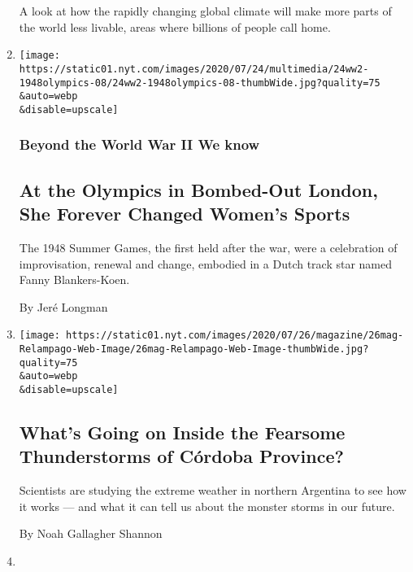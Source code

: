 \begin{enumerate}
  A look at how the rapidly changing global climate will make more parts
  of the world less livable, areas where billions of people call home.
\item
  \href{/2020/07/24/magazine/1948-olympics-fanny-blankers-koen.html}{}

  \texttt{[image: https://static01.nyt.com/images/2020/07/24/multimedia/24ww2-1948olympics-08/24ww2-1948olympics-08-thumbWide.jpg?quality=75\\\&auto=webp\\\&disable=upscale]}

  \hypertarget{beyond-the-world-war-ii-we-know}{%
  \subsubsection{Beyond the World War II We
  know}\label{beyond-the-world-war-ii-we-know}}

  \hypertarget{at-the-olympics-in-bombed-out-london-she-forever-changed-womens-sports}{%
  \subsection{At the Olympics in Bombed-Out London, She Forever Changed
  Women's
  Sports}\label{at-the-olympics-in-bombed-out-london-she-forever-changed-womens-sports}}

  The 1948 Summer Games, the first held after the war, were a
  celebration of improvisation, renewal and change, embodied in a Dutch
  track star named Fanny Blankers-Koen.

  By Jeré Longman
\item
  \href{/interactive/2020/07/22/magazine/worst-storms-argentina.html}{}

  \texttt{[image: https://static01.nyt.com/images/2020/07/26/magazine/26mag-Relampago-Web-Image/26mag-Relampago-Web-Image-thumbWide.jpg?quality=75\\\&auto=webp\\\&disable=upscale]}

  \hypertarget{whats-going-on-inside-the-fearsome-thunderstorms-of-cuxf3rdoba-province}{%
  \subsection{What's Going on Inside the Fearsome Thunderstorms of
  Córdoba
  Province?}\label{whats-going-on-inside-the-fearsome-thunderstorms-of-cuxf3rdoba-province}}

  Scientists are studying the extreme weather in northern Argentina to
  see how it works --- and what it can tell us about the monster storms
  in our future.

  By Noah Gallagher Shannon
\item
  \href{/interactive/2020/07/22/magazine/zambia-kariba-dam.html}{}


\end{enumerate}
